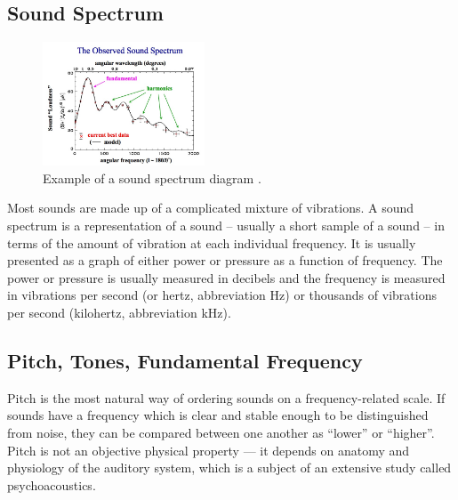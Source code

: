 \vspace{10pt}

\subsection{Sound Spectrum}

\begin{figure}
  \vspace{-50pt}

  \begin{center}
    \includegraphics[width=0.43\textwidth]{Figures/soundspectrum}
  \end{center}
  \caption{Example of a sound spectrum diagram \cite{soundspectrum}.}
  \label{fig:soundspectrumexample}
\end{figure}


Most sounds are made up of a complicated mixture of vibrations. A sound spectrum is a representation of a sound – usually a short sample of a sound – in terms of the amount of vibration at each individual frequency. It is usually presented as a graph of either power or pressure as a function of frequency. The power or pressure is usually measured in decibels and the frequency is measured in vibrations per second (or hertz, abbreviation Hz) or thousands of vibrations per second (kilohertz, abbreviation kHz). 

\vspace{10pt}

\subsection{Pitch, Tones, Fundamental Frequency}

Pitch is the most natural way of ordering sounds on a frequency-related scale. If sounds have a frequency which is clear and stable enough to be distinguished from noise, they can be compared between one another as “lower” or “higher”. Pitch is not an objective physical property — it depends on anatomy and physiology of the auditory system, which is a subject of an extensive study called psychoacoustics. 

